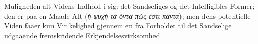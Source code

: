 \documentclass[12pt,a4paper]{book}
\newcommand{\gk}[1]{\textit{#1}}
\begin{document}
Muligheden alt Videns Indhold i sig: det Sandseliges og det
Intelligibles Former; den er paa en Maade Alt (\gk{ἡ ψυχὴ τὰ ὄντα
πώς ἐστι πάντα}); men dens potentielle Viden faaer kun Vir\-%
kelighed gjennem en fra Forholdet til det Sandselige udgaaende
fremskridende Erkjendelsesvirksomhed.
\end{document}
